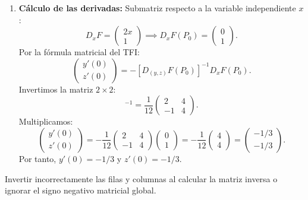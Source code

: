 \documentclass[11pt,a4paper]{article}
\begin{document}
\begin{enumerate}[label=\textbf{\arabic*.}]
\item \textbf{Cálculo de las derivadas:}
Submatriz respecto a la variable independiente $x$:
\begin{equation*}
D_x F = \begin{pmatrix} 2x \\ 1 \end{pmatrix} \implies D_x F(P_0) = \begin{pmatrix} 0 \\ 1 \end{pmatrix}.
\end{equation*}
Por la fórmula matricial del TFI:
\begin{equation*}
\begin{pmatrix} y'(0) \\ z'(0) \end{pmatrix} = - [D_{(y,z)}F(P_0)]^{-1} D_x F(P_0).
\end{equation*}
Invertimos la matriz $2\times 2$:
\begin{equation*}
[D_{(y,z)}F(P_0)]^{-1} = \frac{1}{12} \begin{pmatrix} 2 & 4 \\ -1 & 4 \end{pmatrix}.
\end{equation*}
Multiplicamos:
\begin{equation*}
\begin{pmatrix} y'(0) \\ z'(0) \end{pmatrix} = - \frac{1}{12} \begin{pmatrix} 2 & 4 \\ -1 & 4 \end{pmatrix} \begin{pmatrix} 0 \\ 1 \end{pmatrix} = - \frac{1}{12} \begin{pmatrix} 4 \\ 4 \end{pmatrix} = \begin{pmatrix} -1/3 \\ -1/3 \end{pmatrix}.
\end{equation*}
Por tanto, $y'(0) = -1/3$ y $z'(0) = -1/3$.
\end{enumerate}

\begin{trapbox}
Invertir incorrectamente las filas y columnas al calcular la matriz inversa o ignorar el signo negativo matricial global.
\end{trapbox}
\end{document}
